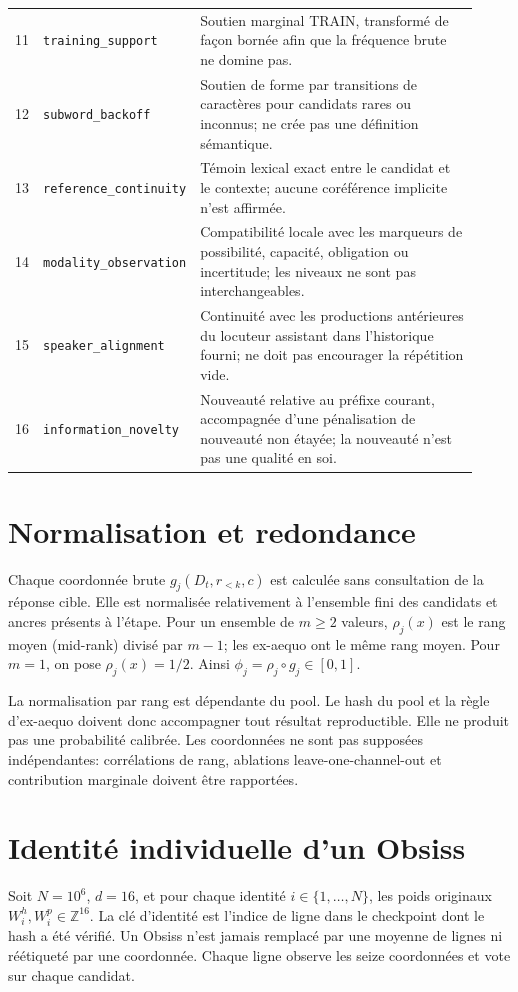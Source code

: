 \documentclass[11pt,a4paper]{report}
\begin{document}
\begin{longtable}{p{0.055\linewidth}p{0.26\linewidth}p{0.61\linewidth}}
11 & \texttt{training\_support} & Soutien marginal TRAIN, transformé de façon bornée afin que la fréquence brute ne domine pas.\\
12 & \texttt{subword\_backoff} & Soutien de forme par transitions de caractères pour candidats rares ou inconnus; ne crée pas une définition sémantique.\\
13 & \texttt{reference\_continuity} & Témoin lexical exact entre le candidat et le contexte; aucune coréférence implicite n'est affirmée.\\
14 & \texttt{modality\_observation} & Compatibilité locale avec les marqueurs de possibilité, capacité, obligation ou incertitude; les niveaux ne sont pas interchangeables.\\
15 & \texttt{speaker\_alignment} & Continuité avec les productions antérieures du locuteur assistant dans l'historique fourni; ne doit pas encourager la répétition vide.\\
16 & \texttt{information\_novelty} & Nouveauté relative au préfixe courant, accompagnée d'une pénalisation de nouveauté non étayée; la nouveauté n'est pas une qualité en soi.\\
\bottomrule
\end{longtable}

\section{Normalisation et redondance}
Chaque coordonnée brute $g_j(D_t,r_{<k},c)$ est calculée sans consultation de la réponse cible. Elle est normalisée relativement à l'ensemble fini des candidats et ancres présents à l'étape. Pour un ensemble de $m\geq2$ valeurs, $\rho_j(x)$ est le rang moyen (mid-rank) divisé par $m-1$; les ex-aequo ont le même rang moyen. Pour $m=1$, on pose $\rho_j(x)=1/2$. Ainsi $\phi_j=\rho_j\circ g_j\in[0,1]$.

La normalisation par rang est dépendante du pool. Le hash du pool et la règle d'ex-aequo doivent donc accompagner tout résultat reproductible. Elle ne produit pas une probabilité calibrée. Les coordonnées ne sont pas supposées indépendantes: corrélations de rang, ablations leave-one-channel-out et contribution marginale doivent être rapportées.

\section{Identité individuelle d'un Obsiss}
Soit $N=10^6$, $d=16$, et pour chaque identité $i\in\{1,\ldots,N\}$, les poids originaux $W_i^h,W_i^p\in\mathbb Z^{16}$. La clé d'identité est l'indice de ligne dans le checkpoint dont le hash a été vérifié. Un Obsiss n'est jamais remplacé par une moyenne de lignes ni réétiqueté par une coordonnée. Chaque ligne observe les seize coordonnées et vote sur chaque candidat.
\end{document}
